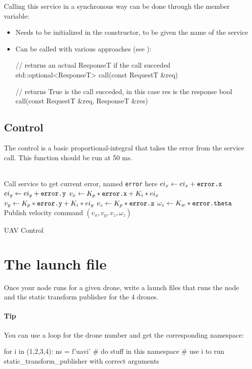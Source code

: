 \documentclass{ecnreport}
\begin{document}
Calling this service in a synchronous way can be done through the  member variable:
\begin{itemize}
 \item Needs to be initialized in the constructor, to be given the name of the service
 \item Can be called with various approaches (see ):
 \begin{cppcode}
  // returns an actual ResponseT if the call succeded
  std::optional<ResponseT> call(const RequestT &req)

  // returns True is the call succeded, in this case res is the response
  bool call(const RequestT &req, ResponseT &res)
 \end{cppcode}
\end{itemize}

\subsection{Control}

\newcommand{\var}[1]{\texttt{\upshape #1}}

The control is a basic proportional-integral that takes the error from the service call.
This function should be run at 50 ms.

 \begin{algorithm}[!h]
 \DontPrintSemicolon
 \;
 \Fill{}
 {
 \\
 Call service to get current error, named \var{error} here\;
 $ei_x \gets ei_x + \var{error.x}$ \;
 $ei_y \gets ei_y + \var{error.y}$ \;
 $v_x \gets K_p*\var{error.x} + K_i*ei_x$ \;
 $v_y \gets K_p*\var{error.y} + K_i*ei_y$ \;
 $v_z \gets K_p*\var{error.z}$ \;
 $\omega_z \gets K_w*\var{error.theta}$ \;
 Publish velocity command $(v_x,v_y,v_z,\omega_z)$\;
}
\caption{UAV Control}
\label{backtracking}
\end{algorithm}

\newpage
\section{The launch file}

Once your node runs for a given drone, write a launch files that runs the node and the static transform publisher for the 4 drones.

\paragraph{Tip} You can use a loop for the drone number and get the corresponding namespace:
\begin{pythoncode}
    for i in (1,2,3,4):
        ns = f'uav{i}'
        # do stuff in this namespace
        # use i to run static_transform_publisher with correct arguments
\end{pythoncode}
\end{document}
